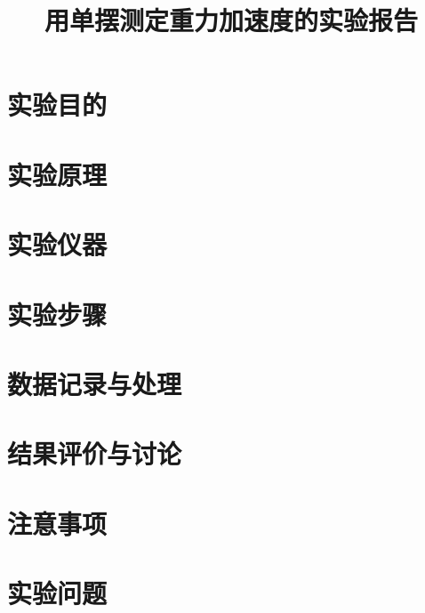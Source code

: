\documentclass{lzureport}
\title{用单摆测定重力加速度的实验报告}  %
\date{\zhtoday} %
\begin{document}
\makeheader %


\section{实验目的}

\section{实验原理}

\section{实验仪器}

\section{实验步骤}

\section{数据记录与处理}

\section{结果评价与讨论}

\section{注意事项}

\section{实验问题}
\end{document}
